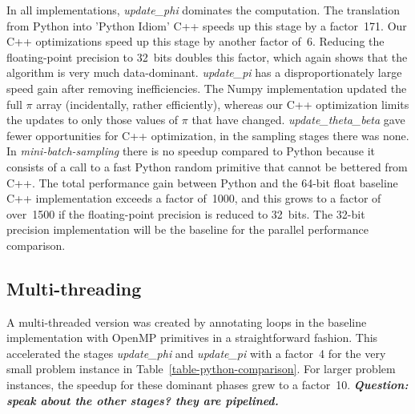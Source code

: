 In all implementations, \textit{update\_phi} dominates the computation.
The translation from Python into 'Python Idiom' C++ speeds up this stage
by a factor~171. %
Our C++ optimizations speed up this stage
by another factor of~6. Reducing the floating-point precision to 32~bits
doubles this factor, which again shows that the algorithm is very much data-dominant.
%
\textit{update\_pi} has a disproportionately large speed
gain after removing inefficiencies. The Numpy implementation updated the full
$\pi$ array (incidentally, rather efficiently), whereas our C++ optimization
limits the updates to only those values of $\pi$ that have changed.
%
\textit{update\_theta\_beta} gave fewer opportunities for C++ optimization,
in the sampling stages there was none. In \textit{mini-batch-sampling} there
is no speedup compared to Python because it consists of a call to
a fast Python random primitive that cannot be bettered from C++.
The total performance gain between Python and the 64-bit float baseline C++
implementation exceeds a factor of~1000, and this grows to a factor of over~1500
if the floating-point precision is reduced to 32~bits. The 32-bit precision
implementation will be the baseline for the parallel performance comparison.

\subsection{Multi-threading}

A multi-threaded version was created by annotating loops in the
baseline implementation with OpenMP primitives in a straightforward
fashion. This accelerated the stages \textit{update\_phi} and
\textit{update\_pi} with a factor~4 for the very small problem instance
in Table~\ref{table-python-comparison}. For larger problem instances, the
speedup for these dominant phases grew to a factor~10.
\textbf{\emph{Question: speak about the other stages? they are pipelined.}}

\begin{comment}
The introduction of a custom user-space random generator brings at most
a very small
benefit. We show it, because it is necessary for the multi-threaded
implementations described in the next section, and this measurement serves to
prove that it does not harm execution speed.
\end{comment}
